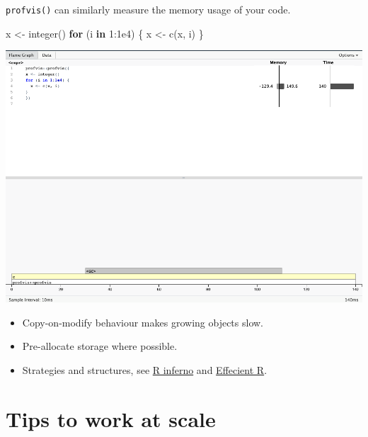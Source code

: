 \documentclass[
  12pt,
]{book}
\newenvironment{Shaded}{\begin{snugshade}}{\end{snugshade}}
\newcommand{\ControlFlowTok}[1]{\textcolor[rgb]{0.13,0.29,0.53}{\textbf{#1}}}
\newcommand{\DecValTok}[1]{\textcolor[rgb]{0.00,0.00,0.81}{#1}}
\newcommand{\FloatTok}[1]{\textcolor[rgb]{0.00,0.00,0.81}{#1}}
\newcommand{\FunctionTok}[1]{\textcolor[rgb]{0.00,0.00,0.00}{#1}}
\newcommand{\NormalTok}[1]{#1}
\newcommand{\OtherTok}[1]{\textcolor[rgb]{0.56,0.35,0.01}{#1}}
\newcommand{\SpecialCharTok}[1]{\textcolor[rgb]{0.00,0.00,0.00}{#1}}
\providecommand{\tightlist}{%
  \setlength{\itemsep}{0pt}\setlength{\parskip}{0pt}}
\begin{document}
\texttt{profvis()} can similarly measure the memory usage of your code.

\begin{Shaded}
\begin{Highlighting}[]
\NormalTok{x }\OtherTok{\textless{}{-}} \FunctionTok{integer}\NormalTok{()}
\ControlFlowTok{for}\NormalTok{ (i }\ControlFlowTok{in} \DecValTok{1}\SpecialCharTok{:}\FloatTok{1e4}\NormalTok{) \{}
\NormalTok{  x }\OtherTok{\textless{}{-}} \FunctionTok{c}\NormalTok{(x, i)}
\NormalTok{\}}
\end{Highlighting}
\end{Shaded}

\includegraphics[width=1\linewidth]{images/403-production-scalability/profiling-example-memory}

\begin{itemize}
\tightlist
\item
  Copy-on-modify behaviour makes growing objects slow.\\
\item
  Pre-allocate storage where possible.
\item
  Strategies and structures, see \href{https://www.burns-stat.com/pages/Tutor/R_inferno.pdf}{R inferno} and \href{https://csgillespie.github.io/efficientR/performance.html}{Effecient R}.
\end{itemize}

\hypertarget{tips-to-work-at-scale}{%
\section{Tips to work at scale}\label{tips-to-work-at-scale}}
\end{document}
